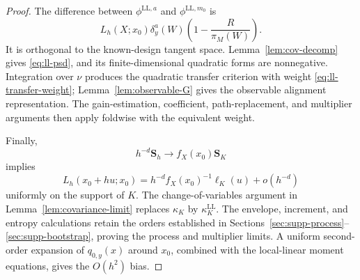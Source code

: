 \begin{proof}
The difference between \(\phi^{\mathrm{LL},a}\) and \(\phi^{\mathrm{LL},m_0}\) is
\[
L_h(X;x_0)\delta_y^a(W)
\left(1-\frac R{\pi_M(W)}\right).
\]
It is orthogonal to the known-design tangent space. Lemma~\ref{lem:cov-decomp} gives \eqref{eq:ll-psd}, and its finite-dimensional quadratic forms are nonnegative. Integration over \(\nu\) produces the quadratic transfer criterion with weight \eqref{eq:ll-transfer-weight}; Lemma~\ref{lem:observable-G} gives the observable alignment representation. The gain-estimation, coefficient, path-replacement, and multiplier arguments then apply foldwise with the equivalent weight.

Finally,
\[
h^{-d}\mathbf S_h\to f_X(x_0)\mathbf S_K
\]
implies
\[
L_h(x_0+hu;x_0)
=
h^{-d}f_X(x_0)^{-1}\ell_K(u)+o(h^{-d})
\]
uniformly on the support of \(K\). The change-of-variables argument in Lemma~\ref{lem:covariance-limit} replaces \(\kappa_K\) by \(\kappa_K^{\mathrm{LL}}\). The envelope, increment, and entropy calculations retain the orders established in Sections~\ref{sec:supp-process}--\ref{sec:supp-bootstrap}, proving the process and multiplier limits. A uniform second-order expansion of \(q_{0,y}(x)\) around \(x_0\), combined with the local-linear moment equations, gives the \(O(h^2)\) bias.
\end{proof}
